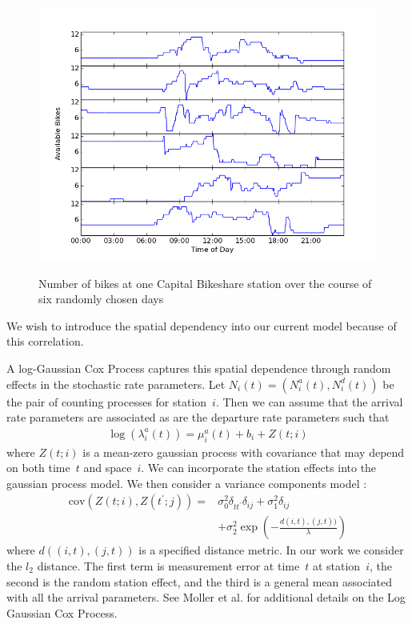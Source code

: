 \documentclass{acm_proc_article-sp}
\begin{document}
\begin{figure} [!h]
\caption{Number of bikes at one Capital Bikeshare station over the course of six randomly chosen days}
\centering
\includegraphics[scale = 0.4]{station_54_6_days.png}
\label{fig:station_54_6_days}
\end{figure}

We wish to introduce the spatial dependency into our current model because of this correlation. 

A log-Gaussian Cox Process captures this spatial dependence through random effects in the stochastic rate parameters.  Let $N_i (t) = (N_i^{a} (t), N_i^{d} (t))$ be the pair of counting processes for station~$i$.  Then we can assume that the arrival rate parameters are associated as are the departure rate parameters such that
\begin{align}
\log \left( \lambda_i^{a} (t) \right) = \mu^{a}_i(t) + b_i + Z(t;i)
\end{align}
\noindent where $Z(t;i)$ is a mean-zero gaussian process with covariance that may depend on both time~$t$ and space~$i$.  We can incorporate the station effects into the gaussian process model.  We then consider a variance components model :
\begin{align*}
\text{cov} ( Z(t;i) , Z(t^\prime; j) ) =& \sigma_0^2 \delta_{t t^\prime}  \delta_{i j} + \sigma_1^2  \delta_{i j} \\
&+ \sigma_2^2 \exp \left( -\frac{ d(i,t),(j,t)) }{\lambda} \right)
\end{align*}
\noindent where $d ( (i,t) , (j,t))$ is a specified distance metric. In our work we consider the $l_2$ distance.  The first term is measurement error at time~$t$ at station~$i$, the second is the random station effect, and the third is a general mean associated with all the arrival parameters.  See Moller et al. \cite{moller:coxproc} for additional details on the Log Gaussian Cox Process.
\end{document}
